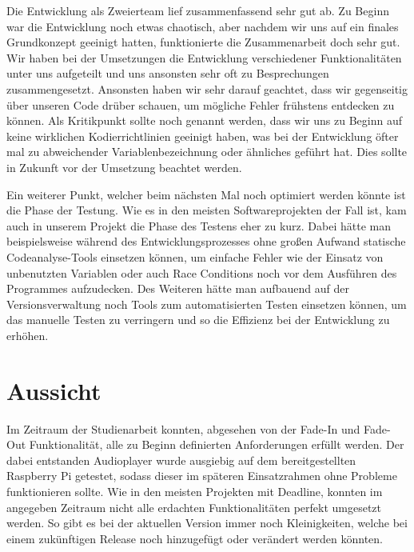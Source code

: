 Die Entwicklung als Zweierteam lief zusammenfassend sehr gut ab.
Zu Beginn war die Entwicklung noch etwas chaotisch, aber
nachdem wir uns auf ein finales Grundkonzept geeinigt hatten, funktionierte die
Zusammenarbeit doch sehr gut. Wir haben bei der Umsetzungen die Entwicklung
verschiedener Funktionalitäten unter uns aufgeteilt und uns ansonsten sehr oft
zu Besprechungen zusammengesetzt. Ansonsten haben wir sehr darauf geachtet, dass
wir gegenseitig über unseren Code drüber schauen, um mögliche Fehler frühstens
entdecken zu können. Als Kritikpunkt sollte noch genannt werden, dass wir uns
zu Beginn auf keine wirklichen Kodierrichtlinien geeinigt haben, was bei der
Entwicklung öfter mal zu abweichender Variablenbezeichnung oder ähnliches
geführt hat. Dies sollte in Zukunft vor der Umsetzung beachtet werden. \newline

Ein weiterer Punkt, welcher beim nächsten Mal noch optimiert werden könnte ist
die Phase der Testung. Wie es in den meisten Softwareprojekten der Fall ist, 
kam auch in unserem Projekt die Phase des Testens eher zu kurz. Dabei hätte man
beispielsweise während des Entwicklungsprozesses ohne großen Aufwand statische
Codeanalyse-Tools einsetzen können, um einfache Fehler wie der Einsatz von
unbenutzten Variablen oder auch Race Conditions noch vor dem Ausführen des
Programmes aufzudecken. Des Weiteren hätte man aufbauend auf der
Versionsverwaltung noch Tools zum automatisierten Testen einsetzen können, um
das manuelle Testen zu verringern und so die Effizienz bei der Entwicklung zu
erhöhen.

\begin{comment}
- Codierrichtlinien
- Viel gelernt
- Go als Programmiersprache
- Kommunikation über Sockets zwischen zwei Programmen
- Analyse zu kurz
- Testung zu kurz
  - Countinous Integration
  - Static Code analysis
  - automatic testing with unit test
\end{comment}



\section{Aussicht}
Im Zeitraum der Studienarbeit konnten, abgesehen von der Fade-In und Fade-Out
Funktionalität, alle zu Beginn definierten Anforderungen erfüllt werden. Der
dabei entstanden Audioplayer wurde ausgiebig auf dem bereitgestellten Raspberry Pi
getestet, sodass dieser im späteren Einsatzrahmen ohne Probleme funktionieren
sollte. \newline
Wie in den meisten Projekten mit Deadline, konnten im angegeben Zeitraum nicht
alle erdachten Funktionalitäten perfekt umgesetzt werden. So gibt es bei der
aktuellen Version immer noch Kleinigkeiten, welche bei einem zukünftigen Release
noch hinzugefügt oder verändert werden könnten. \hfill \break

